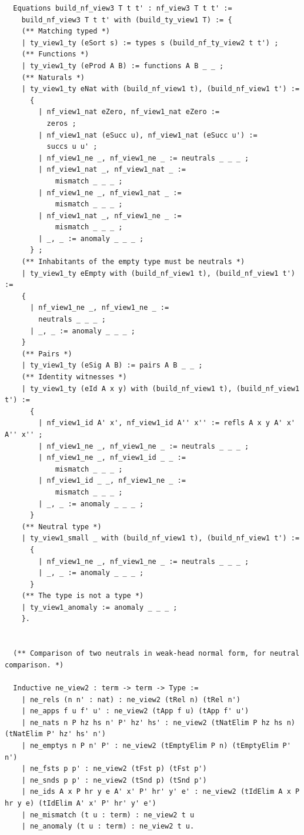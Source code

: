 \documentclass[10pt,a4paper]{amsart}
\begin{document}
\begin{lstlisting}
  Equations build_nf_view3 T t t' : nf_view3 T t t' :=
    build_nf_view3 T t t' with (build_ty_view1 T) := {
    (** Matching typed *)
    | ty_view1_ty (eSort s) := types s (build_nf_ty_view2 t t') ;
    (** Functions *)
    | ty_view1_ty (eProd A B) := functions A B _ _ ;
    (** Naturals *)
    | ty_view1_ty eNat with (build_nf_view1 t), (build_nf_view1 t') :=
      {
        | nf_view1_nat eZero, nf_view1_nat eZero :=
          zeros ;
        | nf_view1_nat (eSucc u), nf_view1_nat (eSucc u') :=
          succs u u' ;
        | nf_view1_ne _, nf_view1_ne _ := neutrals _ _ _ ;
        | nf_view1_nat _, nf_view1_nat _ :=
            mismatch _ _ _ ;
        | nf_view1_ne _, nf_view1_nat _ :=
            mismatch _ _ _ ;
        | nf_view1_nat _, nf_view1_ne _ :=
            mismatch _ _ _ ;
        | _, _ := anomaly _ _ _ ;
      } ;
    (** Inhabitants of the empty type must be neutrals *)
    | ty_view1_ty eEmpty with (build_nf_view1 t), (build_nf_view1 t') :=
    {
      | nf_view1_ne _, nf_view1_ne _ := 
        neutrals _ _ _ ;
      | _, _ := anomaly _ _ _ ;
    }
    (** Pairs *)
    | ty_view1_ty (eSig A B) := pairs A B _ _ ;
    (** Identity witnesses *)
    | ty_view1_ty (eId A x y) with (build_nf_view1 t), (build_nf_view1 t') :=
      {
        | nf_view1_id A' x', nf_view1_id A'' x'' := refls A x y A' x' A'' x'' ;
        | nf_view1_ne _, nf_view1_ne _ := neutrals _ _ _ ;
        | nf_view1_ne _, nf_view1_id _ _ :=
            mismatch _ _ _ ;
        | nf_view1_id _ _, nf_view1_ne _ :=
            mismatch _ _ _ ;
        | _, _ := anomaly _ _ _ ;
      }
    (** Neutral type *)
    | ty_view1_small _ with (build_nf_view1 t), (build_nf_view1 t') :=
      {
        | nf_view1_ne _, nf_view1_ne _ := neutrals _ _ _ ;
        | _, _ := anomaly _ _ _ ;
      }
    (** The type is not a type *)
    | ty_view1_anomaly := anomaly _ _ _ ;
    }.


  (** Comparison of two neutrals in weak-head normal form, for neutral comparison. *)

  Inductive ne_view2 : term -> term -> Type :=
    | ne_rels (n n' : nat) : ne_view2 (tRel n) (tRel n')
    | ne_apps f u f' u' : ne_view2 (tApp f u) (tApp f' u')
    | ne_nats n P hz hs n' P' hz' hs' : ne_view2 (tNatElim P hz hs n) (tNatElim P' hz' hs' n')
    | ne_emptys n P n' P' : ne_view2 (tEmptyElim P n) (tEmptyElim P' n')
    | ne_fsts p p' : ne_view2 (tFst p) (tFst p')
    | ne_snds p p' : ne_view2 (tSnd p) (tSnd p')
    | ne_ids A x P hr y e A' x' P' hr' y' e' : ne_view2 (tIdElim A x P hr y e) (tIdElim A' x' P' hr' y' e')
    | ne_mismatch (t u : term) : ne_view2 t u
    | ne_anomaly (t u : term) : ne_view2 t u.


\end{lstlisting}
\end{document}
